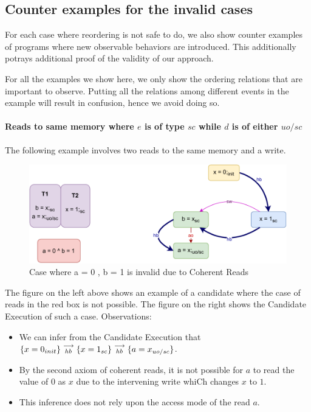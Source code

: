 
\subsection{Counter examples for the invalid cases}

    For each case where reordering is not safe to do, we also show counter examples of programs where new observable behaviors are introduced.
    This additionally potrays additional proof of the validity of our approach. 

    For all the examples we show here, we only show the ordering relations that are important to observe. 
    Putting all the relations among different events in the example will result in confusion, hence we avoid doing so. 

    \paragraph{Reads to same memory where $e$ is of type $sc$ while $d$ is of either $uo/sc$}
        
        The following example involves two reads to the same memory and a write. 
        
        \begin{figure}[H]
            \centering
            \includegraphics[scale=0.7]{InstructionReordering/Example1(Rsc-Ruo,sc).pdf}
            \caption{Case where a = 0 , b = 1 is invalid due to Coherent Reads}
        \end{figure}

        The figure on the left above shows an example of a candidate where the case of reads in the red box is not possible. 
        The figure on the right shows the Candidate Execution of such a case. 
        Observations:
        \begin{itemize}
            \item We can infer from the Candidate Execution that $\{x=0_{init}\}\stackrel{\longrightarrow}{_{hb}}\{x=1_{sc}\}\stackrel{\longrightarrow}{_{hb}}\{a=x_{uo/sc}\}$.
            \item By the second axiom of coherent reads, it is not possible for $a$ to read the value of $0$ as $x$ due to the intervening write whiCh changes $x$ to $1$.  
            \item This inference does not rely upon the access mode of the read $a$. 
        \end{itemize}
        
